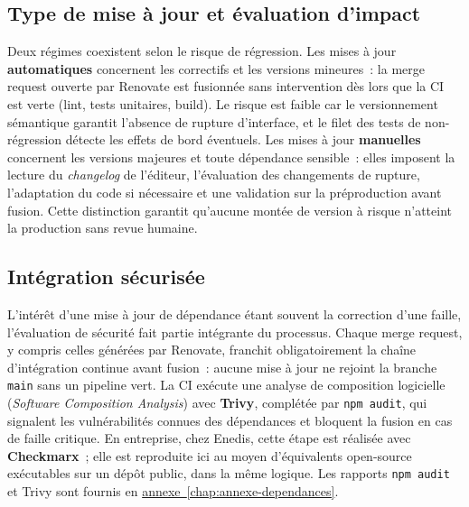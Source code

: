 \subsection{Type de mise à jour et évaluation d'impact}
Deux régimes coexistent selon le risque de régression. Les mises à jour \textbf{automatiques} concernent les correctifs et les versions mineures~: la merge request ouverte par Renovate est fusionnée sans intervention dès lors que la CI est verte (lint, tests unitaires, build). Le risque est faible car le versionnement sémantique garantit l'absence de rupture d'interface, et le filet des tests de non-régression détecte les effets de bord éventuels. Les mises à jour \textbf{manuelles} concernent les versions majeures et toute dépendance sensible~: elles imposent la lecture du \emph{changelog} de l'éditeur, l'évaluation des changements de rupture, l'adaptation du code si nécessaire et une validation sur la préproduction avant fusion. Cette distinction garantit qu'aucune montée de version à risque n'atteint la production sans revue humaine.

\subsection{Intégration sécurisée}
L'intérêt d'une mise à jour de dépendance étant souvent la correction d'une faille, l'évaluation de sécurité fait partie intégrante du processus. Chaque merge request, y compris celles générées par Renovate, franchit obligatoirement la chaîne d'intégration continue avant fusion~: aucune mise à jour ne rejoint la branche \texttt{main} sans un pipeline vert. La CI exécute une analyse de composition logicielle (\emph{Software Composition Analysis}) avec \textbf{Trivy}, complétée par \texttt{npm audit}, qui signalent les vulnérabilités connues des dépendances et bloquent la fusion en cas de faille critique. En entreprise, chez Enedis, cette étape est réalisée avec \textbf{Checkmarx}~; elle est reproduite ici au moyen d'équivalents open-source exécutables sur un dépôt public, dans la même logique. Les rapports \texttt{npm audit} et Trivy sont fournis en \hyperref[chap:annexe-dependances]{annexe~\ref*{chap:annexe-dependances}}.

